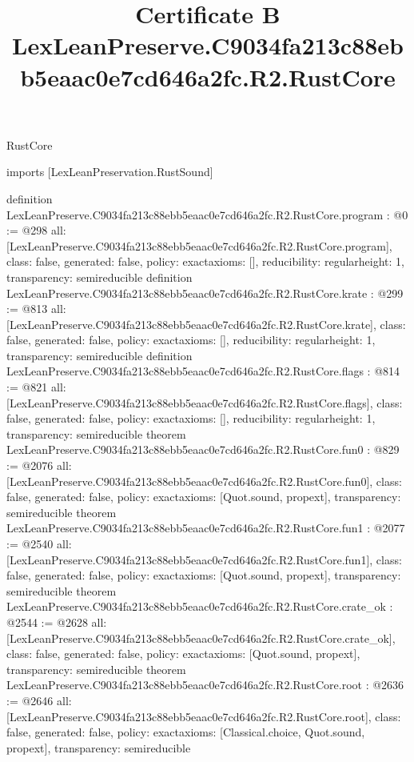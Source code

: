 \begin{lexlean}{RustCore}
\title{Certificate B LexLeanPreserve.C9034fa213c88ebb5eaac0e7cd646a2fc.R2.RustCore}
\begin{coremodule}
imports [LexLeanPreservation.RustSound]

definition LexLeanPreserve.C9034fa213c88ebb5eaac0e7cd646a2fc.R2.RustCore.program : @0 := @298 {
  all: [LexLeanPreserve.C9034fa213c88ebb5eaac0e7cd646a2fc.R2.RustCore.program],
  class: false,
  generated: false,
  policy: exact{axioms: []},
  reducibility: regular{height: 1},
  transparency: semireducible
}
definition LexLeanPreserve.C9034fa213c88ebb5eaac0e7cd646a2fc.R2.RustCore.krate : @299 := @813 {
  all: [LexLeanPreserve.C9034fa213c88ebb5eaac0e7cd646a2fc.R2.RustCore.krate],
  class: false,
  generated: false,
  policy: exact{axioms: []},
  reducibility: regular{height: 1},
  transparency: semireducible
}
definition LexLeanPreserve.C9034fa213c88ebb5eaac0e7cd646a2fc.R2.RustCore.flags : @814 := @821 {
  all: [LexLeanPreserve.C9034fa213c88ebb5eaac0e7cd646a2fc.R2.RustCore.flags],
  class: false,
  generated: false,
  policy: exact{axioms: []},
  reducibility: regular{height: 1},
  transparency: semireducible
}
theorem LexLeanPreserve.C9034fa213c88ebb5eaac0e7cd646a2fc.R2.RustCore.fun0 : @829 := @2076 {
  all: [LexLeanPreserve.C9034fa213c88ebb5eaac0e7cd646a2fc.R2.RustCore.fun0],
  class: false,
  generated: false,
  policy: exact{axioms: [Quot.sound, propext]},
  transparency: semireducible
}
theorem LexLeanPreserve.C9034fa213c88ebb5eaac0e7cd646a2fc.R2.RustCore.fun1 : @2077 := @2540 {
  all: [LexLeanPreserve.C9034fa213c88ebb5eaac0e7cd646a2fc.R2.RustCore.fun1],
  class: false,
  generated: false,
  policy: exact{axioms: [Quot.sound, propext]},
  transparency: semireducible
}
theorem LexLeanPreserve.C9034fa213c88ebb5eaac0e7cd646a2fc.R2.RustCore.crate_ok : @2544 := @2628 {
  all: [LexLeanPreserve.C9034fa213c88ebb5eaac0e7cd646a2fc.R2.RustCore.crate_ok],
  class: false,
  generated: false,
  policy: exact{axioms: [Quot.sound, propext]},
  transparency: semireducible
}
theorem LexLeanPreserve.C9034fa213c88ebb5eaac0e7cd646a2fc.R2.RustCore.root : @2636 := @2646 {
  all: [LexLeanPreserve.C9034fa213c88ebb5eaac0e7cd646a2fc.R2.RustCore.root],
  class: false,
  generated: false,
  policy: exact{axioms: [Classical.choice, Quot.sound, propext]},
  transparency: semireducible
}


\end{coremodule}
\end{lexlean}
